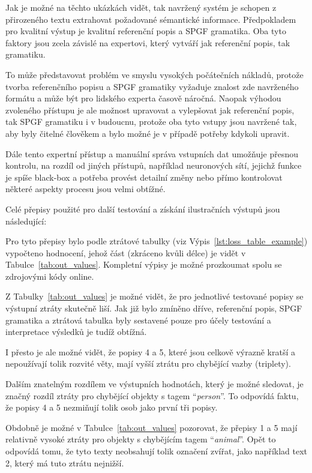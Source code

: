 Jak je možné na těchto ukázkách vidět, tak navržený systém je schopen z přirozeného textu extrahovat požadované sémantické informace.
Předpokladem pro kvalitní výstup je kvalitní referenční popis a SPGF gramatika.
Oba tyto faktory jsou zcela závislé na expertovi, který vytváří jak referenční popis, tak gramatiku.

To může představovat problém ve smyslu vysokých počátečních nákladů, protože tvorba referenčního popisu a SPGF gramatiky
vyžaduje znalost zde navrženého formátu a může být pro lidského experta časově náročná.
Naopak výhodou zvoleného přístupu je ale možnost upravovat a vylepšovat jak referenční popis, tak SPGF gramatiku i v budoucnu,
protože oba tyto vstupy jsou navržené tak, aby byly čitelné člověkem a bylo možné je v případě potřeby kdykoli upravit.

Dále tento expertní přístup a manuální správa vstupních dat umožňuje přesnou kontrolu, na rozdíl od jiných přístupů, například neuronových sítí, jejichž funkce je spíše black-box a
potřeba provést detailní změny nebo přímo kontrolovat některé aspekty procesu jsou velmi obtížné.

Celé přepisy použité pro další testování a získání ilustračních výstupů jsou následující:


Pro tyto přepisy bylo podle ztrátové tabulky (viz Výpis~\ref{lst:loss_table_example}) vypočteno hodnocení,
jehož část (zkráceno kvůli délce) je vidět v Tabulce~\ref{tab:out_values}.
Kompletní výpisy je možné prozkoumat spolu se zdrojovými kódy online.

Z Tabulky~\ref{tab:out_values} je možné vidět, že pro jednotlivé testované popisy se výstupní ztráty skutečně liší.
Jak již bylo zmíněno dříve, referenční popis, SPGF gramatika a ztrátová tabulka byly sestavené pouze pro účely testování
a interpretace výsledků je tudíž obtížná.

I přesto je ale možné vidět, že popisy 4 a 5, které jsou celkově výrazně kratší a nepoužívají tolik rozvité věty,
mají vyšší ztrátu pro chybějící vazby (triplety).

Dalším znatelným rozdílem ve výstupních hodnotách, který je možné sledovat, je značný rozdíl ztráty pro chybějící objekty s tagem \enquote{\emph{person}}.
To odpovídá faktu, že popisy 4 a 5 nezmiňují tolik osob jako první tři popisy.

Obdobně je možné v Tabulce~\ref{tab:out_values} pozorovat, že přepisy 1 a 5 mají relativně vysoké ztráty pro objekty s chybějícím tagem \enquote{\emph{animal}}.
Opět to odpovídá tomu, že tyto texty neobsahují tolik označení zvířat, jako například text 2, který má tuto ztrátu nejnižší.

